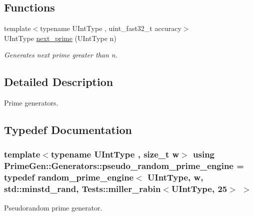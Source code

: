 \subsection*{Functions}
\begin{DoxyCompactItemize}
\item 
{\footnotesize template$<$typename U\+Int\+Type , uint\+\_\+fast32\+\_\+t accuracy$>$ }\\U\+Int\+Type \hyperlink{namespace_prime_gen_1_1_generators_a873d71df2a6aa5006ef2be655b0e96bd}{next\+\_\+prime} (U\+Int\+Type n)
\begin{DoxyCompactList}\small\item\em Generates next prime greater than {\ttfamily n}. \end{DoxyCompactList}\end{DoxyCompactItemize}


\subsection{Detailed Description}
Prime generators. 

\subsection{Typedef Documentation}
\hypertarget{namespace_prime_gen_1_1_generators_a376898a01ff7e348018297a4d1147977}{
\subsubsection[{pseudo\+\_\+random\+\_\+prime\+\_\+engine}]{\setlength{\rightskip}{0pt plus 5cm}template$<$typename U\+Int\+Type , size\+\_\+t w$>$ using {\bf Prime\+Gen\+::\+Generators\+::pseudo\+\_\+random\+\_\+prime\+\_\+engine} = typedef {\bf random\+\_\+prime\+\_\+engine}$<$ U\+Int\+Type, w, std\+::minstd\+\_\+rand, {\bf Tests\+::miller\+\_\+rabin}$<$U\+Int\+Type, 25$>$ $>$}}\label{namespace_prime_gen_1_1_generators_a376898a01ff7e348018297a4d1147977}


Pseudorandom prime generator. 

